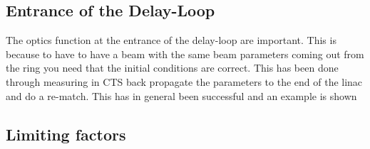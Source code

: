 
\subsection{Entrance of the Delay-Loop}
The optics function at the entrance of the delay-loop are important. 
This is because to have to have a beam with the same beam parameters coming out from 
the ring you need that the initial conditions are correct. 
This has been done through measuring in CTS back propagate the parameters to 
the end of the linac and do a re-match. This has in general been successful and 
an example is shown 
%
\subsection{Limiting factors}
